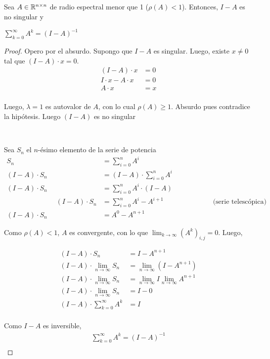 \documentclass[]{article}
\begin{document}
\begin{prop}\label{suma_infinita}
	Sea $A\in\mathbb{R}^{n\times n}$ de radio espectral menor que 1 ($\rho(A)<1$). Entonces, $I-A$ es no singular y
	\begin{center}
		$\displaystyle \sum_{k=0}^{\infty}{A^k} = (I-A)^{-1}$
	\end{center}
	\begin{proof}
		Opero por el absurdo. Supongo que $I-A$ es singular. Luego, existe $x\neq 0$ tal que $(I-A)\cdot x = 0$.
		\begin{align*}
			(I-A)\cdot x &= 0\\
			I\cdot x - A\cdot x &= 0\\
			A\cdot x &= x\\
		\end{align*}

		Luego, $\lambda = 1$ es autovalor de $A$, con lo cual $\rho(A)\geq 1$. Absurdo pues contradice la hipótesis. Luego $(I-A)$ es no singular

		~\newline

		Sea $S_n$ el $n$-ésimo elemento de la serie de potencia
		\begin{align*}
			S_n &= \displaystyle \sum_{i=0}^{n}A^i\\
			(I-A)\cdot S_n &= \displaystyle (I-A)\cdot\sum_{i=0}^{n}A^i\\
			(I-A)\cdot S_n &= \displaystyle \sum_{i=0}^{n}A^i\cdot (I-A)\\
			\hspace{3cm}(I-A)\cdot S_n &= \displaystyle \sum_{i=0}^{n}A^i-A^{i+1} \hspace{3cm} \text{(serie telescópica)}\\
			(I-A)\cdot S_n &= A^0 - A^{n+1}
		\end{align*}

		Como $\rho(A)<1$, $A$ es convergente, con lo que $\displaystyle \lim_{k\to \infty}{(A^k)_{i,j}}=0$. Luego,

		\begin{align*}
			(I-A)\cdot S_n &= I - A^{n+1}\\
			(I-A)\cdot \displaystyle \lim_{n\to\infty} S_n &= \displaystyle \lim_{n\to\infty} (I-A^{n+1})\\
			(I-A)\cdot \displaystyle \lim_{n\to\infty} S_n &= \displaystyle \lim_{n\to\infty} I \lim_{n\to\infty} A^{n+1}\\
			(I-A)\cdot \displaystyle \lim_{n\to\infty} S_n &= I-0\\
			(I-A)\cdot \displaystyle \sum_{k=0}^{\infty}{A^k} &= I\\
		\end{align*}

		Como $I-A$ es inversible, \begin{align*}
			\displaystyle \sum_{k=0}^{\infty}{A^k} = (I-A)^{-1}\\
		\end{align*}
	\end{proof}
\end{prop}
\end{document}
